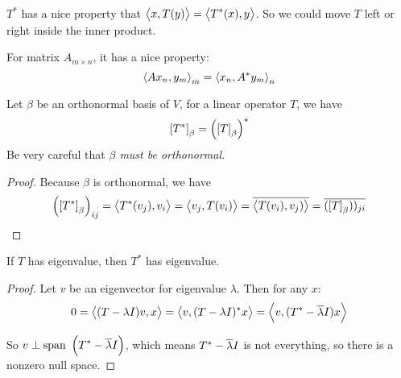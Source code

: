 $T^*$ has a nice property that $\left\langle \displaystyle x, T(y) \right\rangle = \left\langle \displaystyle T^* (x), y \right\rangle$. So we could move $T$ left or right inside the inner product.

For matrix $A_{m \times n}$, it has a nice property:
\begin{equation}
    \left\langle \displaystyle A x_n, y_m \right\rangle_m = \left\langle \displaystyle x_n, A^* y_m \right\rangle_n
\end{equation}

\begin{theorem}\label{operator_conjugate_transpose_requirement}
    Let $\beta$ be an orthonormal basis of $V$, for a linear operator $T$, we have
    \begin{equation}
        \coordinate{T^*}_\beta = \left(\coordinate{T}_\beta\right)^*
    \end{equation}
    Be very careful that \emph{$\beta$ must be orthonormal.}
\end{theorem}
\begin{proof}
    Because $\beta$ is orthonormal, we have
    \begin{equation*}
        \left(\coordinate{T^*}_\beta\right)_{ij} = \innerproduct{T^* (v_j)}{v_i} = \innerproduct{v_j}{T(v_i)} = \conjugate{\innerproduct{T(v_i)}{v_j)}} = \conjugate{(\coordinate{T}_\beta))_{ji}}
    \end{equation*}
\end{proof}



\begin{theorem}\label{congjugate_transpose_has_eigenvalue}
    If $T$ has eigenvalue, then $T^*$ has eigenvalue.    
\end{theorem}
\begin{proof}
    Let $v$ be an eigenvector for eigenvalue $\lambda$. Then for any $x$:
    \begin{equation*}
        0 = \left\langle \displaystyle (T-\lambda I)v, x \right\rangle = \left\langle \displaystyle v, (T-\lambda I)^* x \right\rangle = \left\langle \displaystyle v, (T^* - \overline{\lambda}I) x \right\rangle
    \end{equation*}
    
    So $v \perp \displaystyle \mathrm{span}~\left( T^* - \overline{\lambda}I \right)$, which means $T^* - \overline{\lambda}I$ is not everything, so there is a nonzero null space.
\end{proof}


